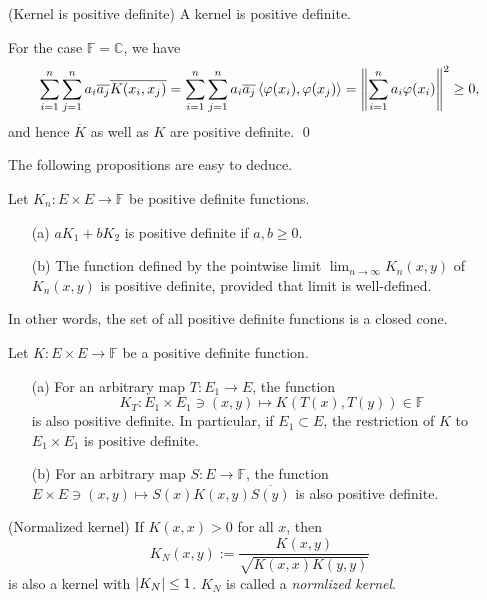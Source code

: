 \documentclass[a4paper,12pt]{article}
\begin{document}
\begin{cor} (Kernel is positive definite)\label{kernel is pd}
	A kernel is positive definite.
\end{cor}
\begin{prf}
	For the case \( \mathbb{F}=\mathbb{C} \), we have
	\begin{equation*}
		\sum_{i=1}^{n} \sum_{j=1}^{n} a_i \overline{a_j} \overline{K(x_i,x_j)}
		= \sum_{i=1}^{n} \sum_{j=1}^{n} a_i \overline{a_j} \left<\varphi(x_i), \varphi(x_j) \right>
		= \left\| \sum_{i=1}^{n} a_i \varphi(x_i)  \right\|^2 \ge 0,
	\end{equation*}
	and hence \( \overline{K} \) as well as \( K \) are positive definite.
	\qed\end{prf}

The following propositions are easy to deduce.
\begin{prp}
	Let \( K_n : E \times E \to \mathbb{F} \) be positive definite functions.
	\begin{itemize}
		\item[(a)] \( a K_1 + b K_2 \) is positive definite if \( a, b \ge 0 \).
		\item[(b)] The function defined by the pointwise limit \( \lim_{n \to \infty} K_n(x,y) \) of \( K_n(x,y) \) is positive definite, provided that limit is well-defined.
	\end{itemize}
	In other words, the set of all positive definite functions is a closed cone.
\end{prp}

\begin{prp} \label{pd with map is pd}
	Let \( K:E \times E \to \mathbb{F} \) be a positive definite function.
	\begin{itemize}
		\item[(a)] For an arbitrary map \( T:E_1 \to E \), the function
		      \begin{equation*}
			      K_T:E_1 \times E_1 \ni (x,y)  \mapsto K(T(x),T(y)) \in \mathbb{F}
		      \end{equation*}
		      is also positive definite. In particular, if \( E_1 \subset E \), the restriction of \( K \) to \( E_1 \times E_1 \) is positive definite.
		\item[(b)] For an arbitrary map \( S:E \to \mathbb{F} \), the function \(E \times E \ni (x,y) \mapsto  S(x)K(x,y)\overline{S(y)} \) is also positive definite.
	\end{itemize}
\end{prp}

\begin{ex} (Normalized kernel)
	If \( K(x,x) >0 \) for all \( x \), then
	\[
		K_N(x,y) := \frac{K(x,y)}{\sqrt{K(x,x)K(y,y)}}
	\]
	is also a kernel with \( \left| K_N \right| \le 1 \). \( K_N \) is called a \textit{normlized kernel}.
	\fin\end{ex}
\end{document}

